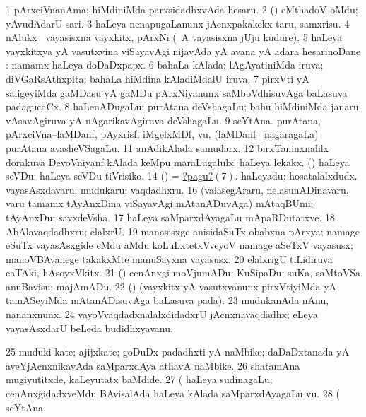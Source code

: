 \noindent
\gl{\pagu}
\bmng
\bnum
\num{1}  pArxciVnanAma; hiMdiniMda parxsidadhxvAda hesaru. 
\num{2}  (\ashi) eMthadoV oMdu; yAvudAdarU sari. 
\num{3}  haLeya nenapugaLanunx jAcnxpakakekx taru, samxrisu. 
\num{4}  nAlukx \mo\ vayasisxna vayxkitx, pArxNi (\kanmu\ A vayasisxna jUju kudure). 
\num{5}  haLeya vayxkitxya yA vasutxvina viSayavAgi nijavAda yA avana yA adara hesarinoDane \parx:  namamx haLeya doDaDxpapx. 
\num{6}  bahaLa kAlada; lAgAyatiniMda iruva; diVGaRsAthxpita; bahaLa hiMdina kAladiMdalU iruva. 
\hypertarget{oldpagu7}{} 
\num{7}  pirxVti yA saligeyiMda gaMDasu yA gaMDu pArxNiyanunx saMboVdhisuvAga baLasuva padagucaCx. 
\num{8}  haLenADugaLu; purAtana deVshagaLu; bahu hiMdiniMda janaru vAsavAgiruva yA nAgarikavAgiruva deVshagaLu. 
\num{9}  seYtAna. 
  
\banum
{} purAtana, pArxciVna--laMDanf, pAyxrisf, iMgelxMDf, \mo vu. 
 (laMDanf \mo\ nagaragaLa) purAtana avasheVSagaLu. 
\eanum
\numie
\num{11}  anAdikAlada samudarx. 
\num{12}  birxTaninxnalilx dorakuva DevoVniyanf kAlada keMpu maraLugalulx. 
  
\banum
{} haLeya lekakx. 
 (\rUpa) haLeya seVDu:  haLeya seVDu tiVrisiko. 
\eanum
\numie
\num{14}  (\ashi) = \hyperlink{oldpagu7}{?pagu?\((7)\)}. 
  
\banum
{} haLeyadu; hosatalalxdudx. 
 vayasAsxdavaru; mudukaru; vaqdadhxru. 
\eanum
\numie
\num{16}  (valasegAraru, nelasunADinavaru, \mo varu tamamx tAyAnxDina viSayavAgi mAtanADuvAga) mAtaqBUmi; tAyAnxDu; savxdeVsha. 
\num{17}  haLeya saMparxdAyagaLu mApaRDutatxve. 
\num{18}  AbAlavaqdadhxru; elalxrU. 
\num{19}  manasisxge anisidaSuTx obabxna pArxya; namage eSuTx vayasAsxgide eMdu aMdu koLuLxtetxVveyoV namage aSeTxV vayasusx; manoVBAvanege takakxMte manuSayxna vayasusx. 
\num{20}  elalxrigU tiLidiruva caTAki, hAsoyxVkitx. 
\num{21}  (\ashi) cenAnxgi moVjumADu; KuSipaDu; suKa, saMtoVSa anuBavisu; majAmADu. 
\num{22}  (\ame) (vayxkitx yA vasutxvanunx pirxVtiyiMda yA tamASeyiMda mAtanADisuvAga baLasuva pada). 
\num{23}  mudukanAda nAnu, nananxnunx. 
\num{24}  vayoVvaqdadxnalalxdidadxrU jAcnxnavaqdadhx; eLeya vayasAsxdarU beLeda budidhxyavanu. 
\num{25}  muduki kate; ajijxkate; goDuDx padadhxti yA naMbike; daDaDxtanada yA aveYjAcnxnikavAda saMparxdAya athavA naMbike. 
\num{26}  shatamAna mugiyutitxde, kaLeyutatx baMdide. 
\num{27} (  haLeya sudinagaLu; cenAnxgidadxveMdu BAvisalAda haLeya kAlada saMparxdAyagaLu \mo vu. 
\num{28} (  seYtAna. 
\enum
\emng
\eentry

